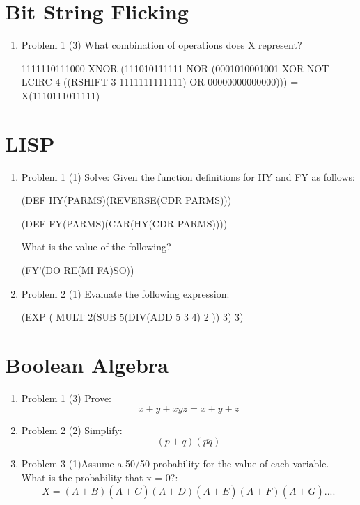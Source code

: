 \documentclass{article}
\begin{document}
\section{Bit String Flicking}
\begin{enumerate}
    \item{Problem 1 (3) What combination of operations does X represent?}
    
    1111110111000 XNOR (111010111111 NOR (0001010001001 XOR NOT LCIRC-4 ((RSHIFT-3 1111111111111) OR 00000000000000)))
    = X(1110111011111)
\end{enumerate}
\section{LISP}
\begin{enumerate}
    \item{Problem 1 (1) Solve:}
    Given the function definitions for HY and FY as follows:
    
    (DEF HY(PARMS)(REVERSE(CDR PARMS)))
    
    (DEF FY(PARMS)(CAR(HY(CDR PARMS))))
    
    What is the value of the following?
    
    (FY'(DO RE(MI FA)SO))
    \item{Problem 2 (1)}
    Evaluate the following expression:
    
    (EXP ( MULT 2(SUB 5(DIV(ADD 5 3 4) 2 )) 3) 3)
\end{enumerate}
\section{Boolean Algebra}
\begin{enumerate}
    \item{Problem 1 (3)} 
    Prove:
    $$\overline{x} + \overline{y} + xy\overline{z} = \overline{x} + \overline{y} + \overline{z}$$
    \bigskip
    \bigskip
    
    \item{Problem 2 (2)}
    Simplify: 
    $$(p + q)(\overline{pq})$$
    \bigskip
    
    \item{Problem 3 (1)}Assume a 50/50 probability for the value of each variable. What is the probability that x = 0?:
    $$X = (A+B)(A+\overline{C})(A+D)(A+\overline{E})(A+F)(A+\overline{G})....$$
   
    
    \bigskip
    \bigskip
    \bigskip
    
    
\end{enumerate}
\end{document}
